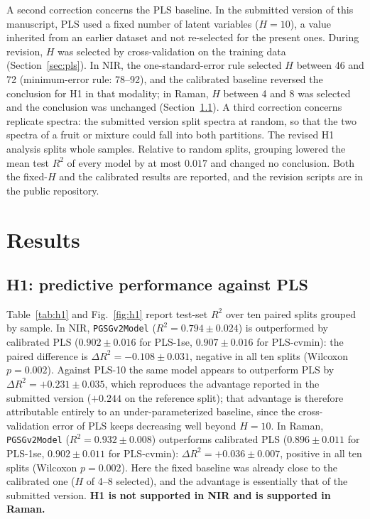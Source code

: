 \documentclass[preprint,12pt]{elsarticle}
\begin{document}
A second correction concerns the PLS baseline. In the submitted version of this manuscript, PLS used a fixed number of latent variables ($H=10$), a value inherited from an earlier dataset and not re-selected for the present ones. During revision, $H$ was selected by cross-validation on the training data (Section~\ref{sec:pls}). In NIR, the one-standard-error rule selected $H$ between 46 and 72 (minimum-error rule: 78--92), and the calibrated baseline reversed the conclusion for H1 in that modality; in Raman, $H$ between 4 and 8 was selected and the conclusion was unchanged (Section~\ref{sec:results-h1}). A third correction concerns replicate spectra: the submitted version split spectra at random, so that the two spectra of a fruit or mixture could fall into both partitions. The revised H1 analysis splits whole samples. Relative to random splits, grouping lowered the mean test $R^{2}$ of every model by at most $0.017$ and changed no conclusion. Both the fixed-$H$ and the calibrated results are reported, and the revision scripts are in the public repository.

\section{Results}
\label{sec:results}

\subsection{H1: predictive performance against PLS}
\label{sec:results-h1}

Table~\ref{tab:h1} and Fig.~\ref{fig:h1} report test-set $R^{2}$ over ten paired splits grouped by sample. In NIR, \texttt{PGSGv2Model} ($R^{2}=0.794\pm0.024$) is outperformed by calibrated PLS ($0.902\pm0.016$ for PLS-1se, $0.907\pm0.016$ for PLS-cvmin): the paired difference is $\Delta R^{2}=-0.108\pm0.031$, negative in all ten splits (Wilcoxon $p=0.002$). Against PLS-10 the same model appears to outperform PLS by $\Delta R^{2}=+0.231\pm0.035$, which reproduces the advantage reported in the submitted version ($+0.244$ on the reference split); that advantage is therefore attributable entirely to an under-parameterized baseline, since the cross-validation error of PLS keeps decreasing well beyond $H=10$. In Raman, \texttt{PGSGv2Model} ($R^{2}=0.932\pm0.008$) outperforms calibrated PLS ($0.896\pm0.011$ for PLS-1se, $0.902\pm0.011$ for PLS-cvmin): $\Delta R^{2}=+0.036\pm0.007$, positive in all ten splits (Wilcoxon $p=0.002$). Here the fixed baseline was already close to the calibrated one ($H$ of 4--8 selected), and the advantage is essentially that of the submitted version. \textbf{H1 is not supported in NIR and is supported in Raman.}
\end{document}
